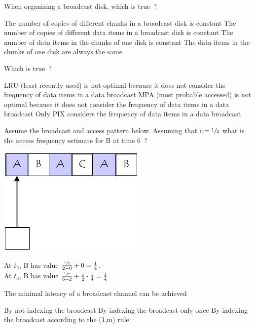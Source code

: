 \documentclass[12pt,a4paper,answers]{exam} %
\begin{document}
\begin{flushleft}
\begin{multicols*}{2}
\begin{questions}
\question When organizing a broadcast disk, which is true~?
\begin{checkboxes}
\CorrectChoice The number of copies of different chunks in a broadcast disk is constant
\choice The number of copies of different data items in a broadcast disk is constant
\CorrectChoice The number of data items in the chunks of one disk is constant
\choice The data items in the chunks of one disk are always the same
\end{checkboxes}

\question Which is true~?
\begin{checkboxes}
\CorrectChoice LRU (least recently used) is not optimal because it does not consider the frequency of data items in a data broadcast
\CorrectChoice MPA (most probable accessed) is not optimal because it does not consider the frequency of data items in a data broadcast
\CorrectChoice Only PIX considers the frequency of data items in a data broadcast
\end{checkboxes}

\question Assume the broadcast and access pattern below. Assuming that $c=\sfrac{1}{2}$ what is the access frequency estimate for B at time 6~?
\begin{colfig}
\centering
\includegraphics[scale=0.75]{w9_s49}
\end{colfig}
\begin{checkboxes}
\choice {}
\CorrectChoice {}
\choice {}
\choice {}
\end{checkboxes}
\begin{solution}

At $t_2$, B has value $\frac{\sfrac{1}{2}}{2-0}+0 = \frac{1}{4}$.\\
At $t_6$, B has value $\frac{\sfrac{1}{2}}{6-2}+\frac{1}{2}\cdot\frac{1}{4} = \frac{1}{4}$
\end{solution}

\question The minimal latency of a broadcast channel can be achieved
\begin{checkboxes}
\CorrectChoice By not indexing the broadcast
\choice By indexing the broadcast only once
\choice By indexing the broadcast according to the (1,m) rule
\end{checkboxes}


\end{questions}
\end{multicols*}
\end{flushleft}
\end{document}
